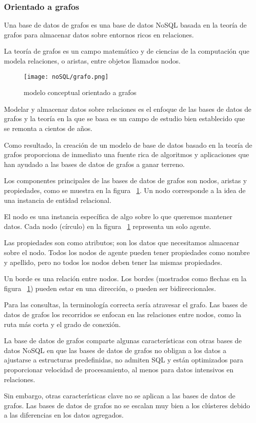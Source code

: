 \subsubsection{Orientado a grafos}
Una base de datos de grafos es una base de datos NoSQL basada en la teoría de grafos para almacenar datos sobre entornos ricos en relaciones.


La teoría de grafos es un campo matemático y de ciencias de la computación que modela relaciones, o aristas, entre objetos llamados nodos. 

\begin{figure}[h!t] 
    \centering
    \texttt{[image: noSQL/grafo.png]}
    \caption{modelo conceptual orientado a grafos}
    \label{img:nosql-grafo}
\end{figure}


Modelar y almacenar datos sobre relaciones es el enfoque de las bases de datos de grafos y la teoría en la que se basa es un campo de estudio bien establecido que se remonta a cientos de años. 


Como resultado, la creación de un modelo de base de datos basado en la teoría de grafos proporciona de inmediato una fuente rica de algoritmos y aplicaciones que han ayudado a las bases de datos de grafos a ganar terreno.


Los componentes principales de las bases de datos de grafos son nodos, aristas y propiedades, como se muestra en la figura ~\ref{img:nosql-grafo}. Un nodo corresponde a la idea de una instancia de entidad relacional.


El nodo es una instancia específica de algo sobre lo que queremos mantener datos. Cada nodo (círculo) en la figura ~\ref{img:nosql-grafo} representa un solo agente. 


Las propiedades son como atributos; son los datos que necesitamos almacenar sobre el nodo. Todos los nodos de agente pueden tener propiedades como nombre y apellido, pero no todos los nodos deben tener las mismas propiedades.


Un borde es una relación entre nodos. Los bordes (mostrados como flechas en la figura ~\ref{img:nosql-grafo}) pueden estar en una dirección, o pueden ser bidireccionales.


Para las consultas, la terminología correcta sería atravesar el grafo. Las bases de datos de grafos los recorridos se enfocan en las relaciones entre nodos, como la ruta más corta y el grado de conexión.


La base de datos de grafos comparte algunas características con otras bases de datos NoSQL en que las bases de datos de grafos no obligan a los datos a ajustarse a estructuras predefinidas, no admiten SQL y están optimizados para proporcionar velocidad de procesamiento, al menos para datos intensivos en relaciones.


Sin embargo, otras características clave no se aplican a las bases de datos de grafos. Las bases de datos de grafos no se escalan muy bien a los clústeres debido a las diferencias en los datos agregados.